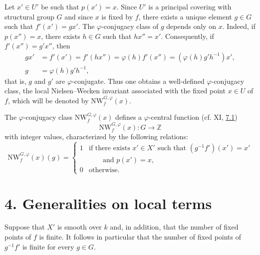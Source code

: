 \documentclass[11pt]{article}
\providecommand{\bZ}{\mathbb Z}
\begin{document}
Let $x'\in U'$ be such that $p(x')=x$. Since $U'$ is a principal covering with structural group $G$ and since $x$ is fixed by $f$, there exists a unique element $g\in G$ such that $f'(x')=gx'$. The $\varphi$-conjugacy class of $g$ depends only on $x$. Indeed, if $p(x'')=x$, there exists $h\in G$ such that $hx''=x'$. Consequently, if $f'(x'')=g'x''$, then
\begin{align*}
gx'&=f'(x')=f'(hx'')=\varphi(h)f'(x'')=(\varphi(h)g'h^{-1})x',\\
g&=\varphi(h)g'h^{-1},
\end{align*}
that is, $g$ and $g'$ are $\varphi$-conjugate. Thus one obtains a well-defined $\varphi$-conjugacy class, the local Nielsen--Wecken invariant associated with the fixed point $x\in U$ of $f$, which will be denoted by $\mathrm{NW}_{f}^{G,\varphi}(x)$.

The $\varphi$-conjugacy class $\mathrm{NW}_{f}^{G,\varphi}(x)$ defines a $\varphi$-central function (cf. XI, \hyperref[sga5:XII:subsection:7.1]{7.1})
\[
\mathrm{NW}_{f}^{G,\varphi}(x):G\longrightarrow \bZ
\]
with integer values, characterized by the following relations:
\begin{equation}\tag{3.1}\label{sga5:XII:equation:3.1}
\mathrm{NW}_{f}^{G,\varphi}(x)(g)=
\begin{cases}
1&\text{if there exists }x'\in X'\text{ such that }(g^{-1}f')(x')=x'\\
 &\qquad\text{and }p(x')=x,\\
0&\text{otherwise.}
\end{cases}
\end{equation}

\section*{4. Generalities on local terms}\label{sga5:XII:section:4}
Suppose that $X'$ is smooth over $k$ and, in addition, that the number of fixed points of $f$ is finite. It follows in particular that the number of fixed points of $g^{-1}f'$ is finite for every $g\in G$.
\end{document}

